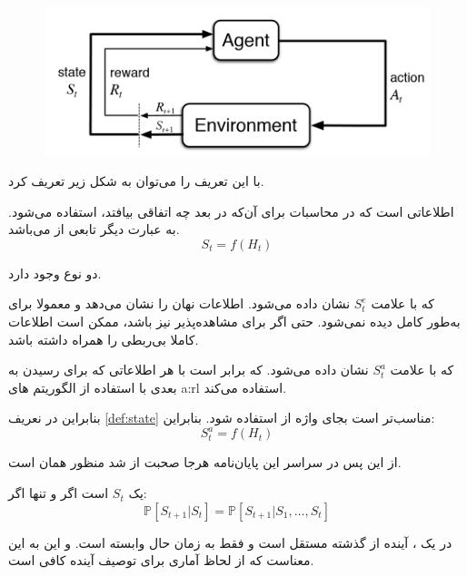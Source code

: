 \begin{figure}[t]
	\centering
	\includegraphics[width=0.7\linewidth]{Figures/RL/Markov-vhain-SARSA}
	\caption{}
	\label{fig:markov-chain-sarsa}
\end{figure}

با این تعریف  را می‌توان به شکل زیر تعریف کرد.

\begin{definition}\label{def:state}
	\textbf{}
	اطلاعاتی است که در محاسبات برای آن‌که در بعد چه اتفاقی بیافتد، استفاده می‌شود. به عبارت دیگر  تابعی از  می‌باشد.
	\[
	S_t = f(H_t)
	\]
\end{definition}

دو نوع  وجود دارد.
\begin{alphabetlist}
	\item \textbf{} که با علامت $S_t^e$ نشان داده می‌شود.
	اطلاعات نهان  را نشان می‌دهد و معمولا برای  به‌طور کامل دیده نمی‌شود. حتی اگر برای  مشاهده‌پذیر نیز باشد، ممکن است اطلاعات کاملا بی‌ربطی را همراه داشته باشد.
	\item \textbf{} که با علامت $S_t^a$ نشان داده می‌شود.
	که برابر است با هر اطلاعاتی که  برای رسیدن به  بعدی با استفاده از الگوریتم های \gls{a:rl} استفاده می‌کند. 
\end{alphabetlist}

بنابراین در نعریف \ref{def:state} مناسب‌تر است بجای واژه  از  استفاده شود. بنابراین:
	\[
	S_t^a = f(H_t)
	\]
	
\begin{note}
	از این پس در سراسر این پایان‌نامه هرجا صحبت از  شد منظور همان  است.
\end{note}
	
\begin{definition}
	یک 
	$S_t$
	است اگر و تنها اگر:
	$$
		\mathbb{P}\left[S_{t+1} | S_{t}\right]=\mathbb{P}\left[S_{t+1} | S_{1}, \ldots, S_{t}\right]
	$$
\end{definition}
در یک ، آینده از گذشته مستقل است و فقط به زمان حال وابسته است.
و این به این معناست که  از لحاظ آماری برای توصیف آینده کافی است.

